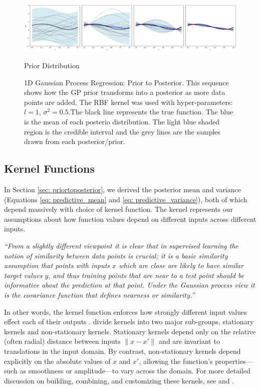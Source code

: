 \documentclass{article}
\begin{document}
\begin{figure}[H]
    \centering
        \includegraphics[width=\textwidth]{LatexPlots/1dplots/priortoposterior.png}
        \caption{Prior Distribution}
    \caption{1D Gaussian Process Regression: Prior to Posterior. This sequence shows how the GP prior transforms into a posterior as more data points are added. 
    The RBF kernel was used with hyper-parameters: $l = 1$, $\sigma^2 = 0.5$.The black line represents the true function. The blue is the mean of each posterio distribution. 
    The light blue shaded region is the credible interval and the grey lines are the samples drawn from each posterior/prior. }
    \label{fig: priortoposterior}
\end{figure}


\subsection{Kernel Functions}
\label{sec: Kernels}

In Section \ref{sec: priortoposterior}, we derived the posterior mean and variance 
(Equations \ref{eq: predictive_mean} and \ref{eq: predictive_variance}), both of which 
depend massively with choice of kernel function. The kernel represents our assumptions 
about how function values depend on different inputs across different inputs.

\vspace{1em}
\noindent
\textit{``From a slightly different viewpoint it is clear that in supervised learning the notion of 
similarity between data points is crucial; it is a basic similarity assumption that points with inputs 
\(x\) which are close are likely to have similar target values \(y\), and thus training points that are 
near to a test point should be informative about the prediction at that point. Under the Gaussian process 
view it is the covariance function that defines nearness or similarity.''} 
\cite[p.~79]{bible}

\vspace{1em}
\noindent
In other words, the kernel function enforces how strongly different input values effect each of their outputs
.\cite{bible} divide kernels into two major sub-groups, stationary kernels and non-stationary kernels. 
Stationary kernels depend only on the relative (often radial) distance between inputs \(\|x - x'\|\) and are invariant to translations 
in the input domain. By contrast, non-stationary kernels depend explicitly on 
the absolute values of \(x\) and \(x'\), allowing the function’s properties—such as smoothness 
or amplitude—to vary across the domain. For more detailed discussion on building, combining, and customizing these kernels, 
see \cite{kernelcookbook} and \cite[Ch.~4]{bible}.
\end{document}

